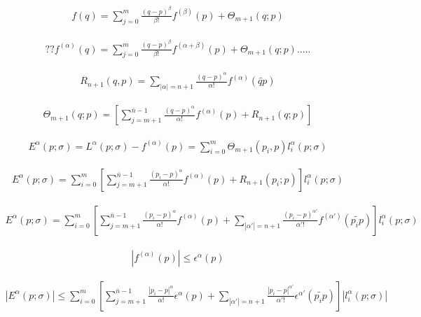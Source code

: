 

\begin{align}
f(q) = \sum_{j=0}^m\frac{(q-p)^{\beta}}{\beta !}f^{(\beta)}(p) + \Theta_{m+1}(q; p)
\end{align}

\begin{align}
??f^{(\alpha)}(q) = \sum_{j=0}^m\frac{(q-p)^{\beta}}{\beta !}f^{(\alpha + \beta)}(p) + \Theta_{m+1}(q; p).....
\end{align}



\begin{align}
R_{n+1}(q, p) = \sum_{|\alpha| = n+1} \frac{(q-p)^{\alpha}}{\alpha !}f^{(\alpha)}(\tilde{qp})
\end{align}

\begin{align}
\Theta_{m+1}(q;p) = [\sum_{j=m+1}^{\bar{n}-1} \frac{(q-p)^{\alpha}}{\alpha !}f^{(\alpha)}(p) + R_{n+1}(q;p)]
\end{align}

\begin{align}
E^{\alpha}(p; \sigma) = L^{\alpha}(p;\sigma) - f^{(\alpha)}(p) = \sum_{i=0}^{m} \Theta_{m+1}(p_i, p) l_i^{\alpha}(p; \sigma)
\end{align}

\begin{align}
E^{\alpha}(p; \sigma) = \sum_{i=0}^{m} [\sum_{j=m+1}^{\bar{n}-1} \frac{(p_i-p)^{\alpha}}{\alpha !}f^{(\alpha)}(p) + R_{n+1}(p_i;p)] l_i^{\alpha}(p; \sigma)
\end{align}

\begin{align}
E^{\alpha}(p; \sigma) = \sum_{i=0}^{m} [\sum_{j=m+1}^{\bar{n}-1} \frac{(p_i-p)^{\alpha}}{\alpha !}f^{(\alpha)}(p) + \sum_{|\alpha'| = n+1} \frac{(p_i-p)^{\alpha'}}{\alpha' !}f^{(\alpha')}(\tilde{p_ip})] l_i^{\alpha}(p; \sigma)
\end{align}


\begin{align}
|f^{(\alpha)}(p)| \le \epsilon^{\alpha}(p)
\end{align}

\begin{align}
|E^{\alpha}(p; \sigma) |\le \sum_{i=0}^{m} [\sum_{j=m+1}^{\bar{n}-1} \frac{|p_i-p|^{\alpha}}{\alpha !}\epsilon^{\alpha}(p) + \sum_{|\alpha'| = n+1} \frac{|p_i-p|^{\alpha'}}{\alpha' !}\epsilon^{\alpha'}(\tilde{p_ip})] |l_i^{\alpha}(p; \sigma)|
\end{align}

